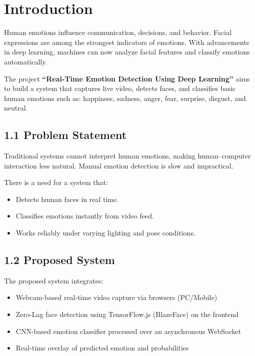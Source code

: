 \documentclass[12pt,a4paper]{report}
\begin{document}

\chapter{Introduction}
\setcounter{page}{1}

Human emotions influence communication, decisions, and behavior. Facial expressions
are among the strongest indicators of emotions. With advancements in deep learning,
machines can now analyze facial features and classify emotions automatically.

The project \textbf{“Real-Time Emotion Detection Using Deep Learning”} aims to build a system
that captures live video, detects faces, and classifies basic human emotions such as:
happiness, sadness, anger, fear, surprise, disgust, and neutral.

\section*{1.1 Problem Statement}

Traditional systems cannot interpret human emotions, making human–computer
interaction less natural. Manual emotion detection is slow and impractical.

There is a need for a system that:

\begin{itemize}
    \item Detects human faces in real time.
    \item Classifies emotions instantly from video feed.
    \item Works reliably under varying lighting and pose conditions.
\end{itemize}

\section*{1.2 Proposed System}

The proposed system integrates:

\begin{itemize}
    \item Webcam-based real-time video capture via browsers (PC/Mobile)
    \item Zero-Lag face detection using TensorFlow.js (BlazeFace) on the frontend
    \item CNN-based emotion classifier processed over an asynchronous WebSocket
    \item Real-time overlay of predicted emotion and probabilities
\end{itemize}
\end{document}
